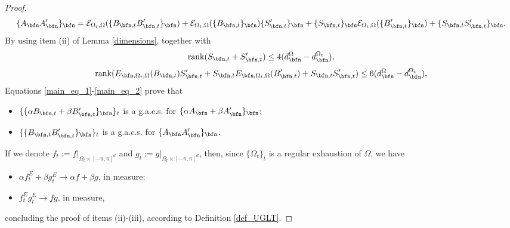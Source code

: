 \documentclass{amsart}
\begin{document}
\begin{proof}
    \begin{equation}\label{main_eq_2}
        \{A_\bfn A'_\bfn\}_\bfn =\mathcal{E}_{\Omega_t,\Omega}(\{B_{\bfn,t} B'_{\bfn,t}\}_\bfn)+\mathcal{E}_{\Omega_t,\Omega}(\{B_{\bfn,t}\}_\bfn)\{S'_{\bfn,t}\}_{\bfn}+\{S_{\bfn,t}\}_{\bfn}\mathcal{E}_{\Omega_t,\Omega}(\{B'_{\bfn,t}\}_\bfn)+\{S_{\bfn,t} S'_{\bfn,t}\}_{\bfn}.
    \end{equation}
    By using item (ii) of Lemma \ref{dimensions}, together with 
    \begin{equation*}
        \mathrm{rank}(S_{\bfn,t}+S'_{\bfn,t})\leq 4(d_{\bfn}^{\Omega}-d_\bfn^{\Omega_t}),
    \end{equation*}
    \begin{equation*}
        \mathrm{rank}(E_{\bfn,\Omega_t,\Omega}(B_{\bfn,t})S'_{\bfn,t}+S_{\bfn,t}E_{\bfn,\Omega_t,\Omega}(B'_{\bfn,t})+S_{\bfn,t} S'_{\bfn,t})\leq 6(d_{\bfn}^{\Omega}-d_\bfn^{\Omega_t}),
    \end{equation*}
    Equations \eqref{main_eq_1}-\eqref{main_eq_2} prove that
    \begin{itemize}
        \item $\{\{\alpha B_{\bfn,t}+\beta B'_{\bfn,t}\}_\bfn\}_t$ is a g.a.c.s. for $\{\alpha A_\bfn + \beta A'_\bfn\}_\bfn$;
        \item $\{\{B_{\bfn,t} B'_{\bfn,t}\}_\bfn\}_t$ is a g.a.c.s. for $\{A_\bfn A'_\bfn\}_\bfn$.
    \end{itemize}
    If we denote $f_t:=f|_{\Omega_t\times[-\pi,\pi]^d}$ and $g_t:=g|_{\Omega_t\times[-\pi,\pi]^d}$, then, since $\{\Omega_t\}_t$ is a regular exhaustion of $\Omega$, we have
    \begin{itemize}
        \item $\alpha f_t^E+\beta g_t^E\to \alpha f+\beta g$, in measure;
        \item $f_t^Eg_t^E\to fg$, in measure,
    \end{itemize}
    concluding the proof of items (ii)-(iii), according to Definition \ref{def_UGLT}.
\end{proof}
\end{document}
